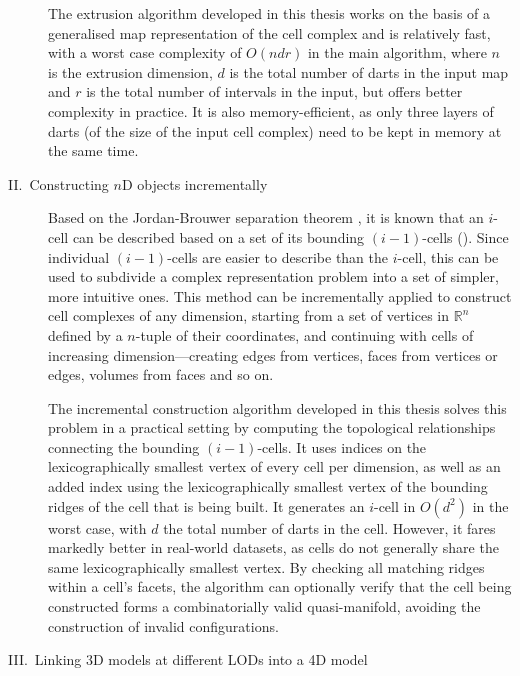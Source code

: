 \begin{description}
The extrusion algorithm developed in this thesis works on the basis of a generalised map representation of the cell complex and is relatively fast, with a worst case complexity of $O(ndr)$ in the main algorithm, where $n$ is the extrusion dimension, $d$ is the total number of darts in the input map and $r$ is the total number of intervals in the input, but offers better complexity in practice.
It is also memory-efficient, as only three layers of darts (of the size of the input cell complex) need to be kept in memory at the same time.


\item[II.\ Constructing $n$D objects incrementally]

Based on the Jordan-Brouwer separation theorem \citep{Lebesgue11,Brouwer11}, it is known that an $i$-cell can be described based on a set of its bounding $(i-1)$-cells ().
Since individual $(i-1)$-cells are easier to describe than the $i$-cell, this can be used to subdivide a complex representation problem into a set of simpler, more intuitive ones.
This method can be incrementally applied to construct cell complexes of any dimension, starting from a set of vertices in $\mathbb{R}^n$ defined by a $n$-tuple of their coordinates, and continuing with cells of increasing dimension---creating edges from vertices, faces from vertices or edges, volumes from faces and so on.

The incremental construction algorithm developed in this thesis solves this problem in a practical setting by computing the topological relationships connecting the bounding $(i-1)$-cells.
It uses indices on the lexicographically smallest vertex of every cell per dimension, as well as an added index using the lexicographically smallest vertex of the bounding ridges of the cell that is being built.
It generates an $i$-cell in $O(d^{2})$ in the worst case, with $d$ the total number of darts in the cell.
However, it fares markedly better in real-world datasets, as cells do not generally share the same lexicographically smallest vertex.
By checking all matching ridges within a cell's facets, the algorithm can optionally verify that the cell being constructed forms a combinatorially valid quasi-manifold, avoiding the construction of invalid configurations.


\item[III.\ Linking 3D models at different LODs into a 4D model]


\end{description}
